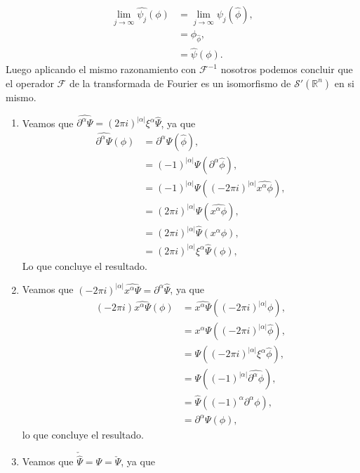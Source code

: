 \begin{homeworkProblem}
\begin{solution}
    \begin{align*}
      \lim_{j \to \infty}\hat{\psi_{j}}(\phi)&=\lim_{j \to \infty}\psi_{j}(\hat{\phi}),\\
      &=\phi_{\hat{\phi}},\\
      &=\hat{\psi}(\phi).
    \end{align*}
    Luego aplicando el mismo razonamiento con $\mathcal{F}^{-1}$ nosotros podemos concluir que el operador $\mathcal{F}$ de la transformada de Fourier es un isomorfismo de $\mathcal{S}'(\mathbb{R}^{n})$ en si mismo.
    \begin{enumerate}
      \item Veamos que $\hat{\partial^{\alpha}\Psi}=(2\pi i)^{|\alpha|}\xi^{\alpha}\hat{\Psi}$, ya que
        \begin{align*}
          \hat{\partial^{\alpha}\Psi}(\phi)&=\partial^{\alpha}\Psi(\hat{\phi}),\\
          &=(-1)^{|\alpha|}\Psi(\partial^{\alpha}\hat{\phi}),\\
          &=(-1)^{|\alpha|}\Psi((-2\pi i)^{|\alpha|}\hat{x^{\alpha}\phi}),\\
          &=(2\pi i)^{|\alpha|}\Psi(\hat{x^{\alpha}\phi}),\\
          &=(2\pi i)^{|\alpha|}\hat{\Psi}(x^{\alpha}\phi),\\
          &=(2\pi i)^{|\alpha|}\xi^{\alpha}\hat{\Psi}(\phi),
        \end{align*}
        Lo que concluye el resultado.
      \item Veamos que $(-2\pi i)^{|\alpha|}\hat{x^{\alpha}\Psi}=\partial^{\alpha}\hat{\Psi}$, ya que
        \begin{align*}
          (-2\pi i)\hat{x^{\alpha}\Psi}(\phi)&=\hat{x^{\alpha}\Psi}((-2\pi i)^{|\alpha|}\phi),\\
          &=x^{\alpha}\Psi((-2\pi i)^{|\alpha|}\hat{\phi}),\\
          &=\Psi((-2\pi i)^{|\alpha|}\xi^{\alpha}\hat{\phi}),\\
          &=\Psi((-1)^{|\alpha|}\hat{\partial^{\alpha}\phi}),\\
          &=\hat{\Psi}((-1)^{\alpha}\partial^{\alpha}\phi),\\
          &=\partial^{\alpha}\Psi(\phi),
        \end{align*}
        lo que concluye el resultado.
      \item Veamos que $\check{\hat{\Psi}}=\Psi=\hat{\check{\Psi}}$, ya que
        \begin{align*}

\end{align*}
\end{enumerate}
\end{solution}
\end{homeworkProblem}
